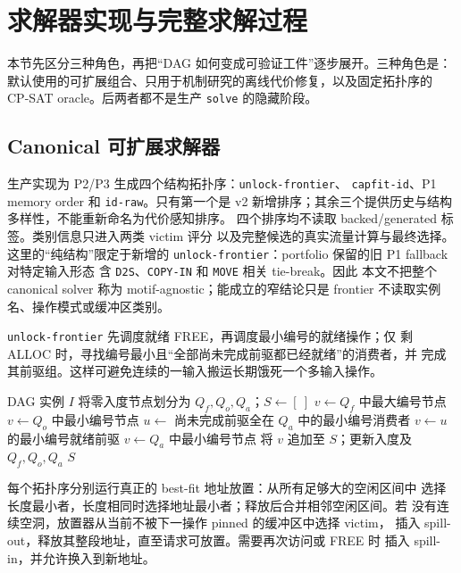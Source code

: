 \section{求解器实现与完整求解过程}\label{sec:supp-solution-zh}

本节先区分三种角色，再把“DAG 如何变成可验证工件”逐步展开。三种角色是：
默认使用的可扩展组合、只用于机制研究的离线代价修复，以及固定拓扑序的
CP-SAT oracle。后两者都不是生产 \texttt{solve} 的隐藏阶段。

\subsection{Canonical 可扩展求解器}

生产实现为 P2/P3 生成四个结构拓扑序：\texttt{unlock-frontier}、
\texttt{capfit-id}、P1 memory order 和 \texttt{id-raw}。只有第一个是 v2
新增排序；其余三个提供历史与结构多样性，不能重新命名为代价感知排序。
四个排序均不读取 backed/generated 标签。类别信息只进入两类 victim 评分
以及完整候选的真实流量计算与最终选择。这里的“纯结构”限定于新增的
\texttt{unlock-frontier}：portfolio 保留的旧 P1 fallback 对特定输入形态
含 \texttt{D2S}、\texttt{COPY-IN} 和 \texttt{MOVE} 相关 tie-break。因此
本文不把整个 canonical solver 称为 motif-agnostic；能成立的窄结论只是
frontier 不读取实例名、操作模式或缓冲区类别。

\texttt{unlock-frontier} 先调度就绪 FREE，再调度最小编号的就绪操作；仅
剩 ALLOC 时，寻找编号最小且“全部尚未完成前驱都已经就绪”的消费者，并
完成其前驱组。这样可避免连续的一输入搬运长期饿死一个多输入操作。

\begin{algorithm}[H]
\caption{依赖前沿拓扑序}\label{alg:supp-frontier-zh}
\begin{algorithmic}[1]
\Require DAG 实例 $I$
\State 将零入度节点划分为 $Q_f,Q_o,Q_a$；$S\gets[\ ]$
   \State $v\gets Q_f$ 中最大编号节点
   \State $v\gets Q_o$ 中最小编号节点
  \Else
    \State $u\gets$ 尚未完成前驱全在 $Q_a$ 中的最小编号消费者
    \State $v\gets u$ 的最小编号就绪前驱
     \State $v\gets Q_a$ 中最小编号节点 \EndIf
  \EndIf
  \State 将 $v$ 追加至 $S$；更新入度及 $Q_f,Q_o,Q_a$
\EndWhile
\State \Return $S$
\end{algorithmic}
\end{algorithm}

每个拓扑序分别运行真正的 best-fit 地址放置：从所有足够大的空闲区间中
选择长度最小者，长度相同时选择地址最小者；释放后合并相邻空闲区间。若
没有连续空洞，放置器从当前不被下一操作 pinned 的缓冲区中选择 victim，
插入 spill-out，释放其整段地址，直至请求可放置。需要再次访问或 FREE 时
插入 spill-in，并允许换入到新地址。

